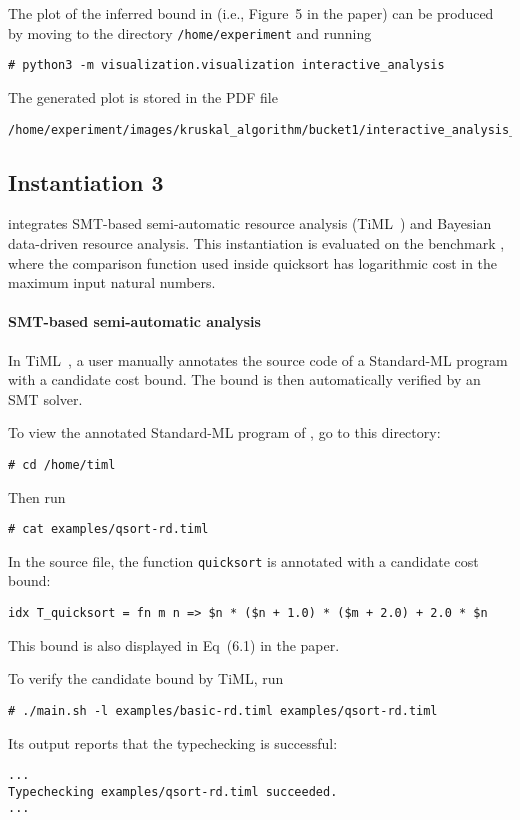 The plot of the inferred bound in \kruskal{} (i.e., Figure~5 in the paper) can
be produced by moving to the directory \texttt{/home/experiment} and running
\begin{verbatim}
# python3 -m visualization.visualization interactive_analysis
\end{verbatim}
%
The generated plot is stored in the PDF file
\begin{verbatim}
/home/experiment/images/kruskal_algorithm/bucket1/interactive_analysis_result.pdf
\end{verbatim}

\subsection{Instantiation 3}
\label{sec:step-by-step-instructions:instantiation-3}

 integrates SMT-based semi-automatic
resource analysis (TiML~\citep{WangWC17}) and Bayesian data-driven resource
analysis.
%
This instantiation is evaluated on the benchmark \quicksorttiml{}, where the
comparison function used inside quicksort has logarithmic cost in the maximum
input natural numbers.

\paragraph{SMT-based semi-automatic analysis}

In TiML~\citep{WangWC17}, a user manually annotates the source code of a
Standard-ML program with a candidate cost bound.
%
The bound is then automatically verified by an SMT solver.

To view the annotated Standard-ML program of \quicksorttiml{}, go to this
directory:
\begin{verbatim}
# cd /home/timl
\end{verbatim}
%
Then run
\begin{verbatim}
# cat examples/qsort-rd.timl
\end{verbatim}
%
In the source file, the function \texttt{quicksort} is annotated with a candidate cost bound:
\begin{verbatim}
idx T_quicksort = fn m n => $n * ($n + 1.0) * ($m + 2.0) + 2.0 * $n
\end{verbatim}
%
This bound is also displayed in Eq~(6.1) in the paper.

To verify the candidate bound by TiML, run
\begin{verbatim}
# ./main.sh -l examples/basic-rd.timl examples/qsort-rd.timl
\end{verbatim}
%
Its output reports that the typechecking is successful:
\begin{verbatim}
...
Typechecking examples/qsort-rd.timl succeeded.
...
\end{verbatim}

